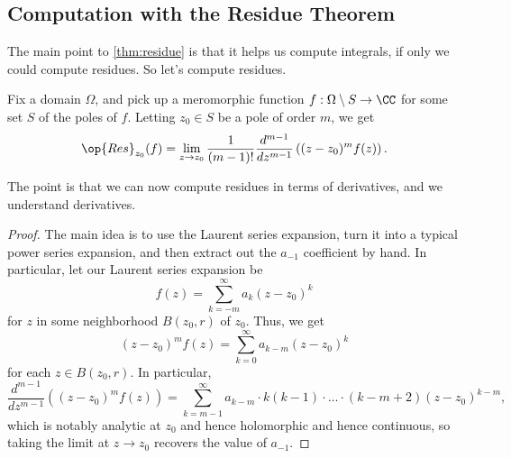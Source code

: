 \subsection{Computation with the Residue Theorem}
The main point to \autoref{thm:residue} is that it helps us compute integrals, if only we could compute residues. So let's compute residues.
\begin{lemma}
	Fix a domain $\Omega$, and pick up a meromorphic function $f:\Omega\setminus S\to\CC$ for some set $S$ of the poles of $f$. Letting $z_0\in S$ be a pole of order $m$, we get
	\[\op{Res}_{z_0}(f)=\lim_{z\to z_0}\frac1{(m-1)!}\frac{d^{m-1}}{dz^{m-1}}\left((z-z_0)^mf(z)\right).\]
\end{lemma}
The point is that we can now compute residues in terms of derivatives, and we understand derivatives.
\begin{proof}
	The main idea is to use the Laurent series expansion, turn it into a typical power series expansion, and then extract out the $a_{-1}$ coefficient by hand. In particular, let our Laurent series expansion be
	\[f(z)=\sum_{k=-m}^\infty a_k(z-z_0)^k\]
	for $z$ in some neighborhood $B(z_0,r)$ of $z_0$. Thus, we get
	\[(z-z_0)^mf(z)=\sum_{k=0}^\infty a_{k-m}(z-z_0)^k\]
	for each $z\in B(z_0,r)$. In particular,
	\[\frac{d^{m-1}}{dz^{m-1}}\left((z-z_0)^mf(z)\right)=\sum_{k=m-1}^\infty a_{k-m}\cdot k(k-1)\cdot\ldots\cdot(k-m+2)(z-z_0)^{k-m},\]
	which is notably analytic at $z_0$ and hence holomorphic and hence continuous, so taking the limit at $z\to z_0$ recovers the value of $a_{-1}$.
\end{proof}

